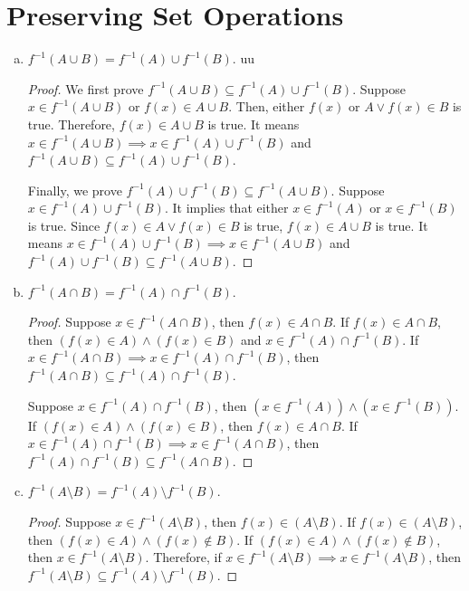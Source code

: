 \documentclass{article}
\begin{document}
\section{Preserving Set Operations}

\begin{enumerate}[(a)]
    \item $f^{-1}(A \cup B) = f^{-1}(A) \cup f^{-1}(B)$.
    uu
    \begin{proof}
    We first prove $f^{-1}(A \cup B) \subseteq f^{-1}(A) \cup f^{-1}(B)$. Suppose $x \in f^{-1}(A \cup B)$ or $f(x) \in A \cup B$. Then, either $f(x)$ or $A \lor f(x) \in B$ is true. Therefore, $f(x) \in A \cup B$ is true. It means $x  \in f^{-1}(A \cup B) \implies x \in f^{-1}(A) \cup f^{-1}(B)$ and $f^{-1}(A \cup B) \subseteq f^{-1}(A) \cup f^{-1}(B)$.
    
    Finally, we prove $f^{-1}(A) \cup f^{-1}(B) \subseteq f^{-1}(A \cup B)$. Suppose $x \in f^{-1}(A) \cup f^{-1}(B)$. It implies that either $x \in f^{-1}(A)$ or $x \in f^{-1}(B)$ is true. Since $f(x) \in A \lor f(x) \in B$ is true, $f(x) \in A \cup B$ is true. It means $x \in f^{-1}(A) \cup f^{-1}(B) \implies x \in f^{-1}(A \cup B)$ and $f^{-1}(A) \cup f^{-1}(B) \subseteq f^{-1}(A \cup B)$.
    \end{proof}
    
    \item $f^{-1}(A \cap B) = f^{-1}(A) \cap f^{-1}(B)$.
    
    \begin{proof}
    Suppose $x \in f^{-1}(A \cap B)$, then $f(x) \in A \cap B$. If $f(x) \in A \cap B$, then $\left( f(x) \in A \right) \land \left( f(x) \in B \right)$ and $x \in f^{-1}(A) \cap f^{-1}(B)$. If $x \in f^{-1}(A \cap B) \implies x \in f^{-1}(A) \cap f^{-1}(B)$, then $f^{-1}(A \cap B) \subseteq f^{-1}(A) \cap f^{-1}(B)$.
    
    Suppose $x \in f^{-1}(A) \cap f^{-1}(B)$, then $\left( x \in f^{-1}(A) \right) \land \left( x \in f^{-1}(B) \right)$. If $\left( f(x) \in A \right) \land \left( f(x) \in B \right)$, then $f(x) \in A \cap B$. If $x \in f^{-1}(A) \cap f^{-1}(B) \implies x \in f^{-1}(A \cap B)$, then $f^{-1}(A) \cap f^{-1}(B) \subseteq f^{-1}(A \cap B)$.
    \end{proof}
    
    \item $f^{-1}(A \setminus B) = f^{-1}(A) \setminus f^{-1}(B)$.
    
    \begin{proof}
    Suppose $x \in f^{-1}(A \setminus B)$, then $f(x) \in (A \setminus B)$. If $f(x) \in (A \setminus B)$, then $\left( f(x) \in A \right) \land \left( f(x) \notin B \right)$. If $\left( f(x) \in A \right) \land \left( f(x) \notin B \right)$, then $x \in f^{-1}(A \setminus B)$. Therefore, if $x \in f^{-1}(A \setminus B) \implies x \in f^{-1}(A \setminus B)$, then $f^{-1}(A \setminus B) \subseteq f^{-1}(A) \setminus f^{-1}(B)$.
    

\end{proof}
\end{enumerate}
\end{document}
